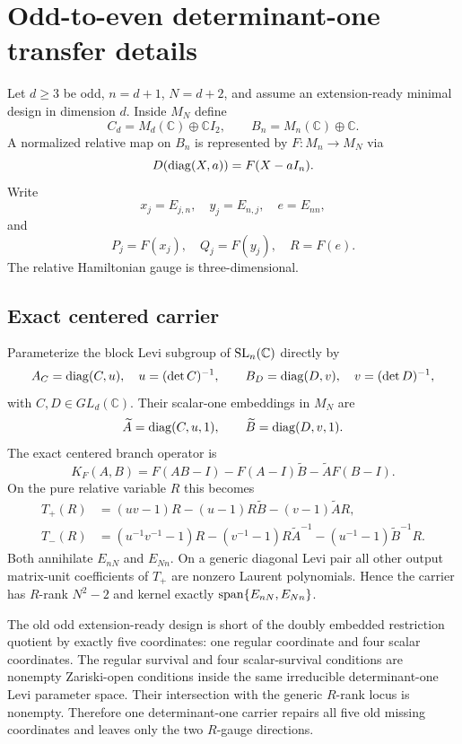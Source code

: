 \section{Odd-to-even determinant-one transfer details}\label{app:transfer-proof}
Let $d\ge3$ be odd, $n=d+1$, $N=d+2$, and assume an extension-ready minimal design in dimension $d$. Inside $M_N$ define
\[
C_d=M_d(\mathbb C)\oplus\mathbb C I_2,
\qquad
B_n=M_n(\mathbb C)\oplus\mathbb C.
\]
A normalized relative map on $B_n$ is represented by $F:M_n\to M_N$ via
\[
D(\operatorname{diag}(X,a))=F(X-aI_n).
\]
Write
\[
x_j=E_{j,n},\quad y_j=E_{n,j},\quad e=E_{nn},
\]
and
\[
P_j=F(x_j),\quad Q_j=F(y_j),\quad R=F(e).
\]
The relative Hamiltonian gauge is three-dimensional.

\subsection{Exact centered carrier}
Parameterize the block Levi subgroup of $\operatorname{SL}_n(\mathbb C)$ directly by
\[
A_C=\operatorname{diag}(C,u),\quad u=(\det C)^{-1},
\qquad
B_D=\operatorname{diag}(D,v),\quad v=(\det D)^{-1},
\]
with $C,D\in GL_d(\mathbb C)$. Their scalar-one embeddings in $M_N$ are
\[
\widetilde A=\operatorname{diag}(C,u,1),\qquad
\widetilde B=\operatorname{diag}(D,v,1).
\]
The exact centered branch operator is
\begin{equation}\label{eq:centered-master-app}
K_F(A,B)
=F(AB-I)-F(A-I)\widetilde B-\widetilde A F(B-I).
\end{equation}
On the pure relative variable $R$ this becomes
\begin{align}
T_+(R)&=(uv-1)R-(u-1)R\widetilde B-(v-1)\widetilde A R,\label{eq:carrier-plus}\\
T_-(R)&=(u^{-1}v^{-1}-1)R-(v^{-1}-1)R\widetilde A^{-1}
-(u^{-1}-1)\widetilde B^{-1}R.\label{eq:carrier-minus}
\end{align}
Both annihilate $E_{nN}$ and $E_{Nn}$. On a generic diagonal Levi pair all other output matrix-unit coefficients of $T_+$ are nonzero Laurent polynomials. Hence the carrier has $R$-rank $N^2-2$ and kernel exactly $\operatorname{span}\{E_{nN},E_{Nn}\}$.

The old odd extension-ready design is short of the doubly embedded restriction quotient by exactly five coordinates: one regular coordinate and four scalar coordinates. The regular survival and four scalar-survival conditions are nonempty Zariski-open conditions inside the same irreducible determinant-one Levi parameter space. Their intersection with the generic $R$-rank locus is nonempty. Therefore one determinant-one carrier repairs all five old missing coordinates and leaves only the two $R$-gauge directions.

